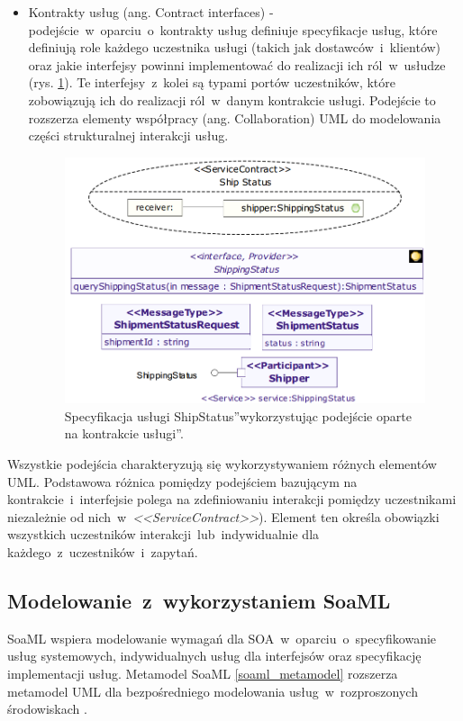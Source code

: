 \begin{itemize}
\item{Kontrakty usług (ang. Contract interfaces) - podejście~w~oparciu~o~kontrakty usług definiuje specyfikacje usług, które definiują role każdego uczestnika usługi (takich jak dostawców~i~klientów) oraz jakie interfejsy powinni implementować do realizacji ich ról~w~usłudze (rys. \ref{service_contract_based_approach}). Te interfejsy~z~kolei są typami portów uczestników, które zobowiązują ich do realizacji ról~w~danym kontrakcie usługi. Podejście to rozszerza elementy współpracy (ang. Collaboration) UML do modelowania części strukturalnej interakcji usług. 
\begin{figure}[h!tbp]
\begin{centering}
\includegraphics[width=11cm]{img/service_contract_based_approach.png}
\caption[Specyfikacja usługi \quotedblbase ShipStatus\textquotedblright wykorzystując podejście oparte na \quotedblbase kontrakcie usługi\textquotedblright. ]{Specyfikacja usługi \quotedblbase ShipStatus\textquotedblright wykorzystując podejście oparte na \quotedblbase kontrakcie usługi\textquotedblright \cite{SoaMLErvBase}.}\label{service_contract_based_approach}
\end{centering}
\end{figure}
}
\end{itemize}

Wszystkie podejścia charakteryzują się wykorzystywaniem różnych elementów UML. Podstawowa różnica pomiędzy podejściem bazującym na kontrakcie~i~interfejsie polega na zdefiniowaniu interakcji pomiędzy uczestnikami niezależnie od nich~w~\emph{<<ServiceContract>>}). Element ten określa obowiązki wszystkich uczestników interakcji~lub~indywidualnie dla każdego~z~uczestników~i~zapytań. 

\subsection{Modelowanie~z~wykorzystaniem SoaML}
SoaML wspiera modelowanie wymagań dla SOA~w~oparciu~o~specyfikowanie usług systemowych, indywidualnych usług dla interfejsów oraz specyfikację implementacji usług. Metamodel SoaML \ref{soaml_metamodel} rozszerza metamodel UML dla bezpośredniego modelowania usług~w~rozproszonych środowiskach \cite{SoaMLErvBase}.

